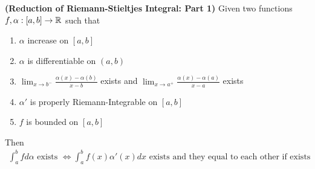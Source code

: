 \documentclass{report}
\begin{document}
\begin{theorem}
\label{RRSI}
\textbf{(Reduction of Riemann-Stieltjes Integral: Part 1)} Given two functions $f,\alpha :[a,b]\rightarrow \mathbb{R}$ such that 
\begin{enumerate}[label=(\alph*)]
  \item $\alpha $ increase on $[a,b]$ 
  \item $\alpha $ is differentiable on $(a,b)$ 
  \item $\lim_{x\to b^-}\frac{\alpha (x)-\alpha (b)}{x-b}$ exists and $\lim_{x\to a^+}\frac{\alpha (x)-\alpha (a)}{x-a}$ exists
  \item $\alpha '$ is properly Riemann-Integrable on $[a,b]$  
  \item $f$ is bounded on  $[a,b]$
\end{enumerate}
Then 
\begin{align*}
\int_a^b fd\alpha \text{ exists }\iff  \int_a^b f(x)\alpha '(x)dx\text{ exists and they equal to each other if exists}
\end{align*}
\end{theorem}
\end{document}
